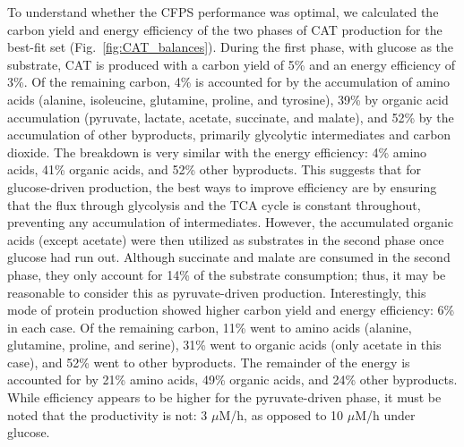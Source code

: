 \documentclass[12pt]{article}
\begin{document}
To understand whether the CFPS performance was optimal, we calculated the carbon yield and energy efficiency of the two phases of CAT production for the best-fit set (Fig.~\ref{fig:CAT_balances}).
During the first phase, with glucose as the substrate, CAT is produced with a carbon yield of 5\% and an energy efficiency of 3\%.
Of the remaining carbon, 4\% is accounted for by the accumulation of amino acids (alanine, isoleucine, glutamine, proline, and tyrosine), 39\% by organic acid accumulation (pyruvate, lactate, acetate, succinate, and malate), and 52\% by the accumulation of other byproducts, primarily glycolytic intermediates and carbon dioxide.
The breakdown is very similar with the energy efficiency: 4\% amino acids, 41\% organic acids, and 52\% other byproducts.
This suggests that for glucose-driven production, the best ways to improve efficiency are by ensuring that the flux through glycolysis and the TCA cycle is constant throughout, preventing any accumulation of intermediates.
However, the accumulated organic acids (except acetate) were then utilized as substrates in the second phase once glucose had run out.
Although succinate and malate are consumed in the second phase, they only account for 14\% of the substrate consumption; thus, it may be reasonable to consider this as pyruvate-driven production.
Interestingly, this mode of protein production showed higher carbon yield and energy efficiency: 6\% in each case.
Of the remaining carbon, 11\% went to amino acids (alanine, glutamine, proline, and serine), 31\% went to organic acids (only acetate in this case), and 52\% went to other byproducts.
The remainder of the energy is accounted for by 21\% amino acids, 49\% organic acids, and 24\% other byproducts.
While efficiency appears to be higher for the pyruvate-driven phase, it must be noted that the productivity is not: 3 $\mu$M/h, as opposed to 10 $\mu$M/h under glucose.
\end{document}
